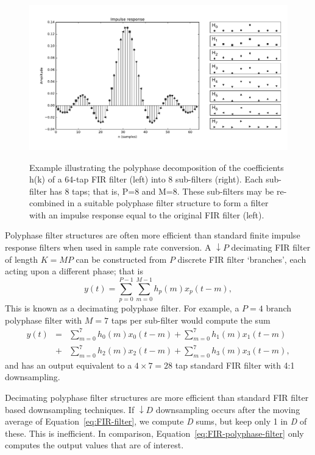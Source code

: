 \documentclass{ws-rv961x669}
\begin{document}
\begin{figure}
 \centering
 \includegraphics[width=\textwidth]{./figures/pfb_taps}
 \label{fig:pfb_taps}
 \caption{Example illustrating the polyphase decomposition of the coefficients h(k) of a 64-tap FIR filter (left) into 8 sub-filters (right). Each sub-filter has 8 taps; that is, P=8 and M=8. These sub-filters may be re-combined in a suitable polyphase filter structure to form a filter with an impulse response equal to the original FIR filter (left).}
\end{figure}

Polyphase filter structures are often more efficient than standard finite impulse response filters when used in sample rate conversion. A $\downarrow P$ decimating FIR filter of length $K=MP$ can be constructed from $P$ discrete FIR filter `branches', each acting upon a different phase; that is
\begin{equation}
y(t)=\sum_{p=0}^{P-1}\sum_{m=0}^{M-1}h_{p}(m)x_{p}(t-m),\label{eq:FIR-polyphase-filter}
\end{equation}
This is known as a decimating polyphase filter. For example, a $P=\mbox{4}$ branch polyphase filter with $M=\mbox{7}$ taps per sub-filter would compute the sum
\begin{eqnarray}
y(t) & = & \sum_{m=0}^{7}h_{0}(m)x_{0}(t-m)+\sum_{m=0}^{7}h_{1}(m)x_{1}(t-m)\nonumber \\
 & + & \sum_{m=0}^{7}h_{2}(m)x_{2}(t-m)+\sum_{m=0}^{7}h_{3}(m)x_{3}(t-m),
\end{eqnarray}
and has an output equivalent to a $\mbox{4}\times\mbox{7}=\mbox{28}$ tap standard FIR filter with 4:1 downsampling. 

Decimating polyphase filter structures are more efficient than standard FIR filter based downsampling techniques. If $\downarrow D$ downsampling occurs after the moving average of Equation~\ref{eq:FIR-filter}, we compute \emph{D} sums, but keep only 1 in \emph{D} of these. This is inefficient. In comparison, Equation~\ref{eq:FIR-polyphase-filter} only computes the output values that are of interest. 
\end{document}
